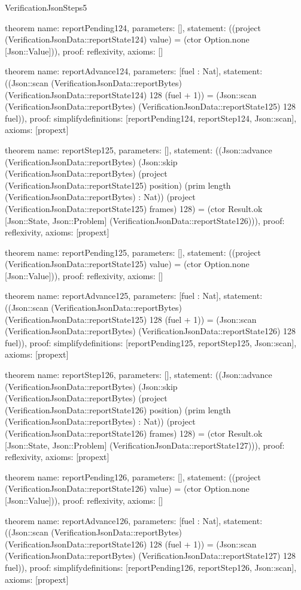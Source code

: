 \begin{lexlean}{VerificationJsonSteps5}
\begin{semanticmodule}
theorem{
  name: reportPending124,
  parameters: [],
  statement: ((project (VerificationJsonData::reportState124) value) = (ctor Option.none [Json::Value])),
  proof: reflexivity{},
  axioms: []
}

theorem{
  name: reportAdvance124,
  parameters: [fuel : Nat],
  statement: ((Json::scan (VerificationJsonData::reportBytes) (VerificationJsonData::reportState124) 128 (fuel + 1)) = (Json::scan (VerificationJsonData::reportBytes) (VerificationJsonData::reportState125) 128 fuel)),
  proof: simplify{definitions: [reportPending124, reportStep124, Json::scan]},
  axioms: [propext]
}

theorem{
  name: reportStep125,
  parameters: [],
  statement: ((Json::advance (VerificationJsonData::reportBytes) (Json::skip (VerificationJsonData::reportBytes) (project (VerificationJsonData::reportState125) position) (prim length (VerificationJsonData::reportBytes) : Nat)) (project (VerificationJsonData::reportState125) frames) 128) = (ctor Result.ok [Json::State, Json::Problem] (VerificationJsonData::reportState126))),
  proof: reflexivity{},
  axioms: [propext]
}

theorem{
  name: reportPending125,
  parameters: [],
  statement: ((project (VerificationJsonData::reportState125) value) = (ctor Option.none [Json::Value])),
  proof: reflexivity{},
  axioms: []
}

theorem{
  name: reportAdvance125,
  parameters: [fuel : Nat],
  statement: ((Json::scan (VerificationJsonData::reportBytes) (VerificationJsonData::reportState125) 128 (fuel + 1)) = (Json::scan (VerificationJsonData::reportBytes) (VerificationJsonData::reportState126) 128 fuel)),
  proof: simplify{definitions: [reportPending125, reportStep125, Json::scan]},
  axioms: [propext]
}

theorem{
  name: reportStep126,
  parameters: [],
  statement: ((Json::advance (VerificationJsonData::reportBytes) (Json::skip (VerificationJsonData::reportBytes) (project (VerificationJsonData::reportState126) position) (prim length (VerificationJsonData::reportBytes) : Nat)) (project (VerificationJsonData::reportState126) frames) 128) = (ctor Result.ok [Json::State, Json::Problem] (VerificationJsonData::reportState127))),
  proof: reflexivity{},
  axioms: [propext]
}

theorem{
  name: reportPending126,
  parameters: [],
  statement: ((project (VerificationJsonData::reportState126) value) = (ctor Option.none [Json::Value])),
  proof: reflexivity{},
  axioms: []
}

theorem{
  name: reportAdvance126,
  parameters: [fuel : Nat],
  statement: ((Json::scan (VerificationJsonData::reportBytes) (VerificationJsonData::reportState126) 128 (fuel + 1)) = (Json::scan (VerificationJsonData::reportBytes) (VerificationJsonData::reportState127) 128 fuel)),
  proof: simplify{definitions: [reportPending126, reportStep126, Json::scan]},
  axioms: [propext]
}


\end{semanticmodule}
\end{lexlean}
